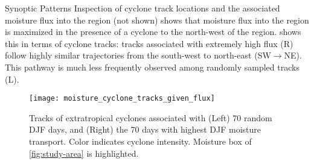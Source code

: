 \begin{block}{Synoptic Patterns}
    Inspection of cyclone track locations and the associated moisture flux into the region (not shown) shows that moisture flux into the region is maximized in the presence of a cyclone to the north-west of the region.
     shows this in terms of cyclone tracks: tracks associated with extremely high flux (R) follow highly similar trajectories from the south-west to north-east (SW$\rightarrow$NE).
    This pathway is much less frequently observed among randomly sampled tracks (L).
    \begin{figure}
        \texttt{[image: moisture\_cyclone\_tracks\_given\_flux]}
        \caption{Tracks of extratropical cyclones associated with (Left) 70 random DJF days, and (Right) the 70 days with highest DJF moisture transport. Color indicates cyclone intensity. Moisture box of \cref{fig:study-area} is highlighted.}
        \label{fig:track-given-flux}
    \end{figure}
\end{block}
